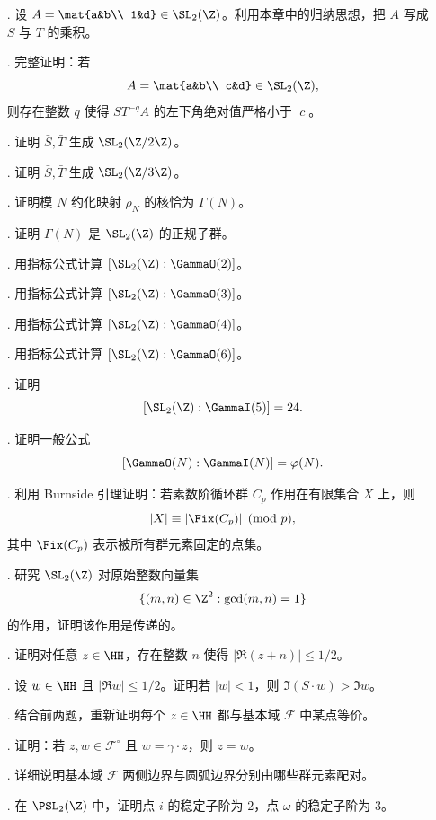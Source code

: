 \begin{enumerate}
  \item[\medium 26.] 设 $A=\mat{a&b\\ 1&d}\in \SL_2(\Z)$。利用本章中的归纳思想，把 $A$ 写成 $S$ 与 $T$ 的乘积。
  \item[\medium 27.] 完整证明：若
  \[
  A=\mat{a&b\\ c&d}\in \SL_2(\Z),
  \]
  则存在整数 $q$ 使得 $ST^{-q}A$ 的左下角绝对值严格小于 $|c|$。
  \item[\medium 28.] 证明 $\bar S,\bar T$ 生成 $\SL_2(\Z/2\Z)$。
  \item[\medium 29.] 证明 $\bar S,\bar T$ 生成 $\SL_2(\Z/3\Z)$。
  \item[\medium 30.] 证明模 $N$ 约化映射 $\rho_N$ 的核恰为 $\Gamma(N)$。
  \item[\medium 31.] 证明 $\Gamma(N)$ 是 $\SL_2(\Z)$ 的正规子群。
  \item[\medium 32.] 用指标公式计算 $[\SL_2(\Z):\GammaO(2)]$。
  \item[\medium 33.] 用指标公式计算 $[\SL_2(\Z):\GammaO(3)]$。
  \item[\medium 34.] 用指标公式计算 $[\SL_2(\Z):\GammaO(4)]$。
  \item[\medium 35.] 用指标公式计算 $[\SL_2(\Z):\GammaO(6)]$。
  \item[\medium 36.] 证明
  \[
  [\SL_2(\Z):\GammaI(5)]=24.
  \]
  \item[\medium 37.] 证明一般公式
  \[
  [\GammaO(N):\GammaI(N)]=\varphi(N).
  \]
  \item[\medium 38.] 利用 Burnside 引理证明：若素数阶循环群 $C_p$ 作用在有限集合 $X$ 上，则
  \[
  |X|\equiv |\Fix(C_p)|\pmod p,
  \]
  其中 $\Fix(C_p)$ 表示被所有群元素固定的点集。
  \item[\medium 39.] 研究 $\SL_2(\Z)$ 对原始整数向量集
  \[
  \{(m,n)\in\Z^2:\gcd(m,n)=1\}
  \]
  的作用，证明该作用是传递的。
  \item[\medium 40.] 证明对任意 $z\in\HH$，存在整数 $n$ 使得 $|\Re(z+n)|\le 1/2$。
  \item[\medium 41.] 设 $w\in\HH$ 且 $|\Re w|\le 1/2$。证明若 $|w|<1$，则 $\Im(S\cdot w)>\Im w$。
  \item[\medium 42.] 结合前两题，重新证明每个 $z\in\HH$ 都与基本域 $\mathcal F$ 中某点等价。
  \item[\medium 43.] 证明：若 $z,w\in\mathcal F^\circ$ 且 $w=\gamma\cdot z$，则 $z=w$。
  \item[\medium 44.] 详细说明基本域 $\mathcal F$ 两侧边界与圆弧边界分别由哪些群元素配对。
  \item[\medium 45.] 在 $\PSL_2(\Z)$ 中，证明点 $i$ 的稳定子阶为 $2$，点 $\omega$ 的稳定子阶为 $3$。

\end{enumerate}
